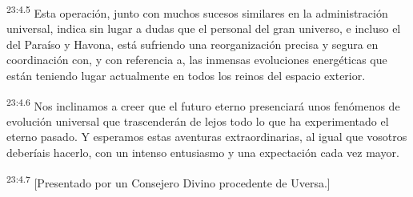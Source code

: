 \par
\textsuperscript{23:4.5} Esta operación, junto con muchos sucesos similares en la administración universal, indica sin lugar a dudas que el personal del gran universo, e incluso el del Paraíso y Havona, está sufriendo una reorganización precisa y segura en coordinación con, y con referencia a, las inmensas evoluciones energéticas que están teniendo lugar actualmente en todos los reinos del espacio exterior.

\par
\textsuperscript{23:4.6} Nos inclinamos a creer que el futuro eterno presenciará unos fenómenos de evolución universal que trascenderán de lejos todo lo que ha experimentado el eterno pasado. Y esperamos estas aventuras extraordinarias, al igual que vosotros deberíais hacerlo, con un intenso entusiasmo y una expectación cada vez mayor.

\par
\textsuperscript{23:4.7} [Presentado por un Consejero Divino procedente de Uversa.]